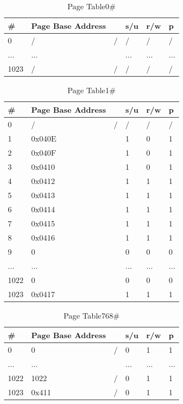 \begin{table}[htbp]
    \centering
 \begin{tabular}{llllll}\toprule
 \#&Page Base Address      & &s/u&r/w&p        \\\midrule
 0&/        &/&/&/&/        \\
 ...&...      & &...&...&...        \\
 1023&/        &/&/&/&/        \\
   \bottomrule
\end{tabular}
\caption{Page Table0\#}\label{table0}
\end{table}

\begin{table}[htbp]
    \centering
 \begin{tabular}{llllll}\toprule
 \#&Page Base Address      & &s/u&r/w&p        \\\midrule
 0&/        &/&/&/&/        \\
 1&0x040E        &&1&0&1        \\
 2&0x040F        &&1&0&1        \\
 3&0x0410        &&1&0&1        \\
 4&0x0412        &&1&1&1        \\
 5&0x0413        &&1&1&1        \\
 6&0x0414        &&1&1&1        \\
 7&0x0415        &&1&1&1        \\
 8&0x0416        &&1&1&1        \\
 9&0        &&0&0&0        \\
 ...&...      & &...&...&...        \\
 1022&0        &&0&0&0        \\
 1023&0x0417        &&1&1&1        \\
   \bottomrule
\end{tabular}
\caption{Page Table1\#}\label{table1}
\end{table}

\begin{table}[htbp]
    \centering
 \begin{tabular}{llllll}\toprule
 \#&Page Base Address      & &s/u&r/w&p        \\\midrule
 0&0        &/&0&1&1        \\
 ...&...      & &...&...&...        \\
 1022&1022        &/&0&1&1        \\
 1023&0x411        &/&0&1&1        \\
   \bottomrule
\end{tabular}
\caption{Page Table768\#}\label{table768}
\end{table}

